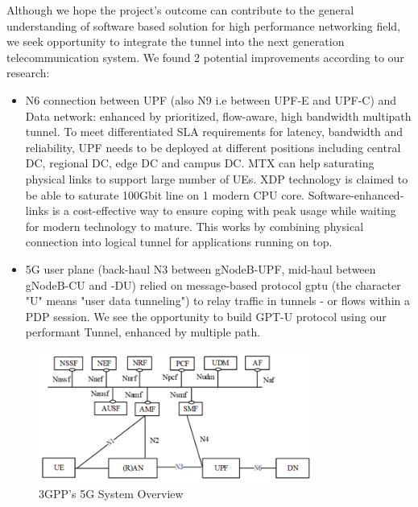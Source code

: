Although we hope the project's outcome can contribute to the general understanding of software based solution for high performance networking field, we seek opportunity to integrate the tunnel into the next generation telecommunication system. We found 2 potential improvements according to our research: 
\begin{itemize}
    \item N6 connection between UPF (also N9 i.e between UPF-E and UPF-C) and Data network: enhanced by prioritized, flow-aware, high bandwidth multipath tunnel. To meet differentiated SLA requirements for latency, bandwidth and reliability, UPF needs to be deployed at different positions including central DC, regional DC, edge DC and campus DC. MTX can help saturating physical links to support large number of UEs. XDP technology is claimed to be able to saturate 100Gbit line on 1 modern CPU core. Software-enhanced-links is a cost-effective way to ensure coping with peak usage while waiting for modern technology to mature. This works by combining physical connection into logical tunnel for applications running on top.
    \item 5G user plane (back-haul N3 between gNodeB-UPF, mid-haul between gNodeB-CU and -DU) relied on message-based protocol \ac{gptu} (the character "U" means "user data tunneling") to relay traffic in tunnels - or flows within a PDP session. We see the opportunity to build GPT-U protocol using our performant Tunnel, enhanced by multiple path.
\end{itemize}

\begin{figure}[H]
	\centering
	\includegraphics[width=0.8\textwidth]{resources/images/3gpp_5g_system_overview.png}
	\caption{3GPP's 5G System Overview \cite{3gpp_5g_system_overview}}
    \label{fig:introduction:3gpp_5g_system_overview}
\end{figure}




